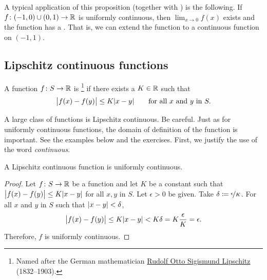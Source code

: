 A typical application of this proposition (together with
)
is the following.
If $f \colon (-1,0) \cup (0,1) \to {\mathbb{R}}$ is uniformly continuous,
then $\lim_{x\to 0} f(x)$ exists and the function
has a \emph{}.
That is,
we can extend the function to a continuous function on $(-1,1)$.


\subsection{Lipschitz continuous functions}

\begin{defn}
A function $f \colon S \to {\mathbb{R}}$
is \emph{}%
\footnote{Named after the German mathematician
\href{https://en.wikipedia.org/wiki/Rudolf_Lipschitz}{Rudolf Otto Sigismund Lipschitz}
(1832--1903).} if there exists a $K \in {\mathbb{R}}$ such that
\begin{equation*}
\bigl\lvert {f(x)-f(y)} \bigr\rvert \leq K \lvert {x-y} \rvert 
\qquad \text{for all } x \text{ and } y \text{ in } S.
\end{equation*}
\end{defn}

A large class of functions is Lipschitz continuous.  Be careful. Just as
for uniformly continuous functions, the
domain of definition of the function is important.  See the examples below
and the exercises.  First, we justify the use of the word \emph{continuous}.

\begin{prop}
A Lipschitz continuous function is uniformly continuous.
\end{prop}

\begin{proof}
Let $f \colon S \to {\mathbb{R}}$ be a function and let $K$ be a constant such that
$\bigl\lvert {f(x)-f(y)} \bigr\rvert \leq K \lvert {x-y} \rvert$
for all $x, y$ in $S$.
Let $\epsilon > 0$ be given.  Take $\delta \coloneqq
\nicefrac{\epsilon}{K}$.
For all $x$ and $y$ in $S$ such that
$\lvert {x-y} \rvert < \delta$,
\begin{equation*}
\bigl\lvert {f(x)-f(y)} \bigr\rvert \leq K \lvert {x-y} \rvert < K \delta = K \frac{\epsilon}{K} =
\epsilon .
\end{equation*}
Therefore, $f$ is uniformly continuous.
\end{proof}

